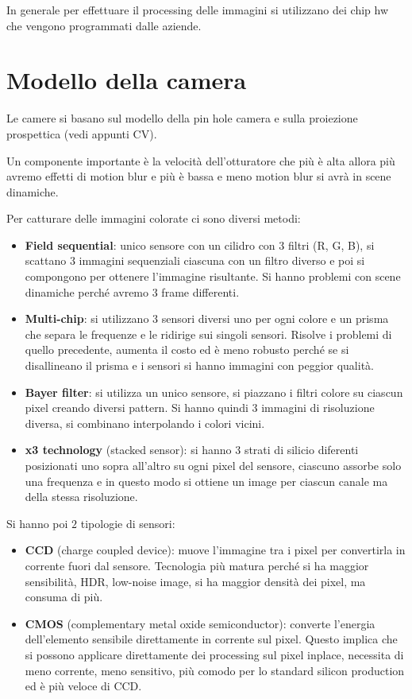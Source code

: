 In generale per effettuare il processing delle immagini si utilizzano dei chip
hw che vengono programmati dalle aziende.

\section{Modello della camera}
Le camere si basano sul modello della pin hole camera e sulla proiezione prospettica 
(vedi appunti CV).

Un componente importante è la velocità dell'otturatore che più è alta allora più 
avremo effetti di motion blur e più è bassa e meno motion blur si avrà in scene 
dinamiche.

Per catturare delle immagini colorate ci sono diversi metodi:
\begin{itemize}
    \item \textbf{Field sequential}: unico sensore con un cilidro con $3$ filtri (R, G, B),
    si scattano $3$ immagini sequenziali ciascuna con un filtro diverso e poi si 
    compongono per ottenere l'immagine risultante. Si hanno problemi con scene 
    dinamiche perché avremo $3$ frame differenti.
    \item \textbf{Multi-chip}: si utilizzano $3$ sensori diversi uno per ogni colore e un 
    prisma che separa le frequenze e le ridirige sui singoli sensori. Risolve i
    problemi di quello precedente, aumenta il costo ed è meno robusto perché se si 
    disallineano il prisma e i sensori si hanno immagini con peggior qualità.
    \item \textbf{Bayer filter}: si utilizza un unico sensore, si piazzano i filtri 
    colore su ciascun pixel creando diversi pattern. Si hanno quindi $3$ immagini 
    di risoluzione diversa, si combinano interpolando i colori vicini.
    \item \textbf{x3 technology} (stacked sensor): si hanno $3$ strati di silicio diferenti 
    posizionati uno sopra all'altro su ogni pixel del sensore, ciascuno assorbe solo una frequenza
    e in questo modo si ottiene un image per ciascun canale ma della stessa risoluzione.
\end{itemize}

Si hanno poi $2$ tipologie di sensori:
\begin{itemize}
    \item \textbf{CCD} (charge coupled device): muove l'immagine tra i pixel per 
    convertirla in corrente fuori dal sensore. Tecnologia più matura perché si ha 
    maggior sensibilità, HDR, low-noise image, si ha maggior densità dei pixel, ma 
    consuma di più.
    \item \textbf{CMOS} (complementary metal oxide semiconductor): converte l'energia dell'elemento sensibile direttamente 
    in corrente sul pixel. Questo implica che si possono applicare direttamente dei 
    processing sul pixel inplace, necessita di meno corrente, meno sensitivo, più
    comodo per lo standard silicon production ed è più veloce di CCD.
\end{itemize}

